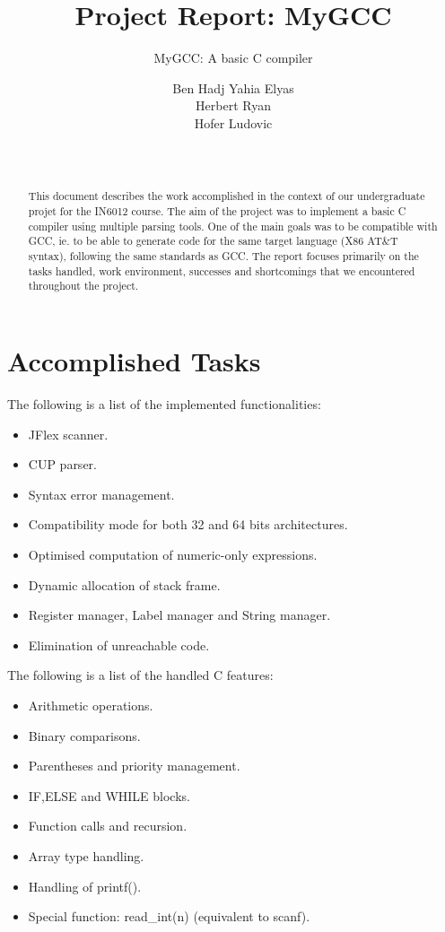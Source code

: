 \documentclass{scrartcl}
\begin{document}
\title{Project Report: MyGCC}
\subtitle{MyGCC: A basic C compiler}
\author{Ben Hadj Yahia Elyas\\Herbert Ryan\\Hofer Ludovic\\\\\\
  \vspace{5cm}{\em University of Bordeaux 1 Science and Technology}}

\maketitle
\newpage
\begin{abstract}
This document describes the work accomplished in the context of our undergraduate projet for the IN6012 course. The aim of the project was to implement a basic C compiler using multiple parsing tools.
One of the main goals was to be compatible with GCC, ie. to be able to generate code for the same target language (X86 AT\&T syntax), following the same standards as GCC.
The report focuses primarily on the tasks handled, work environment, successes and shortcomings that we encountered throughout the project.
\end{abstract}

\vspace{2cm}
\tableofcontents
\newpage 

\section{Accomplished Tasks}
The following is a list of the implemented functionalities:
\begin{itemize}
\item JFlex scanner.
\item CUP parser.
\item Syntax error management.
\item Compatibility mode for both 32 and 64 bits architectures.
\item Optimised computation of numeric-only expressions.
\item Dynamic allocation of stack frame.
\item Register manager, Label manager and String manager.
\item Elimination of unreachable code.
\end{itemize}
\vspace{0.5cm}
The following is a list of the handled C features:
\begin{itemize}
\item Arithmetic operations.
\item Binary comparisons.
\item Parentheses and priority management.
\item IF,ELSE and WHILE blocks.
\item Function calls and recursion.
\item Array type handling.
\item Handling of printf().
\item Special function: read\_int(n) (equivalent to scanf).
\end{itemize}
\end{document}
